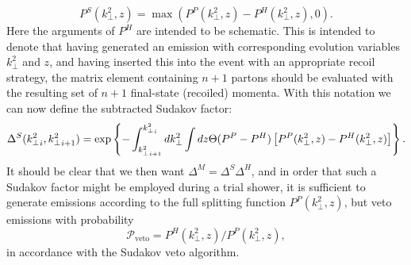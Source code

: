   \begin{equation}
\label{eq:subtracted_splitting_function}
P^S(k^2_\perp,z)= \max\left(P^P(k^2_\perp,z) -P^H(k^2_\perp,z), 0\right).
\end{equation}
%
%
Here the arguments of $P^H$ are intended to be schematic. This is
intended to denote that having generated an emission with
corresponding evolution variables $k^2_\perp$ and $z$, and having
inserted this into the event with an appropriate recoil strategy, the
matrix element containing $n+1$ partons should be evaluated with the
resulting set of $n+1$ final-state (recoiled) momenta. 
With this notation we can now define the subtracted Sudakov factor:
\begin{equation}
 \label{eq:modsudakov_merging}
 \Delta^S({k^2_\perp}_{i},{k^2_\perp}_{i+1})= \exp \left\{ - \int_{{k^2_\perp}_{i+1}}^{{k^2_\perp}_{i}} d k_\perp^2  \int dz \Theta(P^P-P^H) 
   \left[P^P(k^2_\perp,z) - P^H(k^2_\perp,z) \right] \right\}	.
\end{equation}
It should be clear that we then want $\Delta^M = \Delta^S \Delta^H$,
and in order that such a Sudakov factor might be employed during a
trial shower, it is sufficient to generate emissions according to the
full \pyt splitting function $P^P(k^2_\perp,z)$, but veto emissions
with probability
\begin{equation}
 \mathcal{P}_\mathrm{veto} = P^H(k^2_\perp,z) /P^P(k^2_\perp,z),
\end{equation}
in accordance with the Sudakov veto algorithm.


